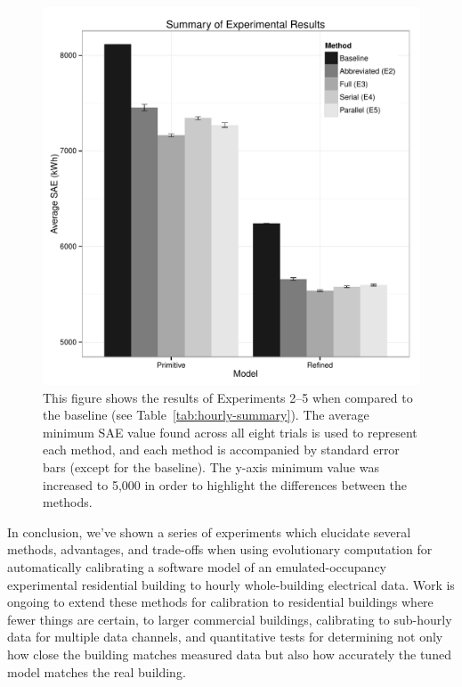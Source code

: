 \documentclass[preprint, review, 12pt]{elsarticle}
\begin{document}
\begin{figure}[tbp]
\centering
\includegraphics[width=5in]{figure3}
\caption{This figure shows the results of Experiments 2--5 when compared to the baseline (see Table~\ref{tab:hourly-summary}). The average minimum SAE value found across all eight trials is used to represent each method, and each method is accompanied by standard error bars (except for the baseline). The y-axis minimum value was increased to 5,000 in order to highlight the differences between the methods.}
\label{fig:hourly-summary}
\end{figure}

In conclusion, we've shown a series of experiments which elucidate several methods, advantages, and trade-offs when using evolutionary computation for automatically calibrating a software model of an emulated-occupancy experimental residential building to hourly whole-building electrical data. Work is ongoing to extend these methods for calibration to residential buildings where fewer things are certain, to larger commercial buildings, calibrating to sub-hourly data for multiple data channels, and quantitative tests for determining not only how close the building matches measured data but also how accurately the tuned model matches the real building.
\end{document}
